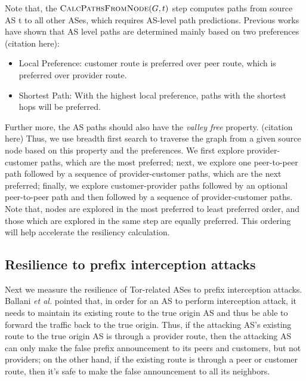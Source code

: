 Note that, the $\Call{CalcPathsFromNode}{G,t}$ step computes paths from source AS t to all other ASes, which requires AS-level path predictions. Previous works have shown that AS level paths are determined mainly based on two preferences (citation here):

\begin{itemize}
\item Local Preference: customer route is preferred over peer route, which is preferred over provider route. 
\item Shortest Path: With the highest local preference, paths with the shortest hops will be preferred. 
\end{itemize}

Further more, the AS paths should also have the \emph{valley free} property. (citation here) Thus, we use breadth first search to traverse the graph from a given source node based on this property and the preferences. We first explore provider-customer paths, which are the most preferred; next, we explore one peer-to-peer path followed by a sequence of provider-customer paths, which are the next preferred; finally, we explore customer-provider paths followed by an optional peer-to-peer path and then followed by a sequence of provider-customer paths. Note that, nodes are explored in the most preferred to least preferred order, and those which are explored in the same step are equally preferred. This ordering will help accelerate the resiliency calculation. 



\subsection{Resilience to prefix interception attacks}
Next we measure the resilience of Tor-related ASes to prefix interception attacks. Ballani \emph{et al.} \cite{ballani2007study} pointed that, in order for an AS to perform interception attack, it needs to maintain its existing route to the true origin AS and thus be able to forward the traffic back to the true origin. Thus, if the attacking AS's existing route to the true origin AS is through a provider route, then the attacking AS can only make the false prefix announcement to its peers and customers, but not providers; on the other hand, if the existing route is through a peer or customer route, then it's safe to make the false announcement to all its neighbors.

